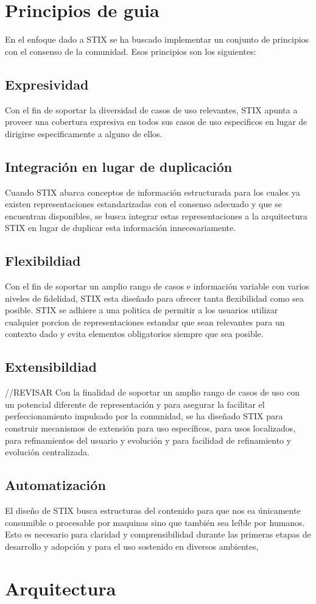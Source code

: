 \section{Principios de guia}
En el enfoque dado a STIX se ha buscado implementar un conjunto de principios 
con el consenso de la comunidad. Esos principios son los siguientes:
\subsection{Expresividad}
Con el fin de soportar la diversidad de casos de uso relevantes, STIX apunta a 
proveer una cobertura expresiva en todos sus casos de uso especificos en lugar 
de dirigirse especificamente a alguno de ellos.
\subsection{Integración en lugar de duplicación}
Cuando STIX abarca conceptos de información estructurada para los cuales ya 
existen representaciones estandarizadas con el consenso adecuado y que se 
encuentran disponibles, se busca integrar estas representaciones a la 
arquitectura STIX en lugar de duplicar esta información innecesariamente.
\subsection{Flexibildiad}
Con el fin de soportar un amplio rango de casos e información variable con 
varios niveles de fidelidad, STIX esta diseñado para ofrecer tanta flexibilidad 
como sea posible. STIX se adhiere a una politica de permitir a los usuarios 
utilizar cualquier porcion de representaciones estandar que sean relevantes para 
un contexto dado y evita elementos obligatorios siempre que sea posible.

\subsection{Extensibildiad} //REVISAR
Con la finalidad de soportar un amplio rango de casos de uso con un potencial 
diferente de representación y para asegurar la facilitar el perfeccionamiento 
impulsado por la comunidad, se ha diseñado STIX para construir mecanismos de 
extensión para uso específicos, para usos localizados, para refinamientos del 
usuario y evolución y para facilidad de refinamiento y evolución centralizada.

\subsection{Automatización}
El diseño de STIX busca estructuras del contenido para que nos ea únicamente 
consumible o procesable por maquinas sino que también sea leíble por humanos. 
Esto es necesario para claridad y comprensibilidad durante las primeras etapas 
de desarrollo y adopción y para el uso sostenido en diversos ambientes,

\section{Arquitectura}

